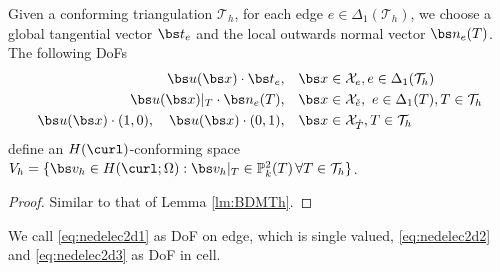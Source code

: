 

 \begin{lemma}
 Given a conforming triangulation $\mathcal T_h$, for each edge $e\in \Delta_1(\mathcal T_h)$, we choose a global tangential vector $\bs t_e$ and the local outwards normal vector $\bs n_e(T)$. The following {\rm DoFs}
   \begin{align}
     \bs u(\bs x) \cdot \bs t_{e}, \quad & 
     \bs x \in \mathcal X_{e}, e \in \Delta_1(\mathcal T_h) \label{eq:nedelec2d1}\\ 
     \bs u(\bs x)|_{T} \cdot \bs n_e(T), \quad & 
     \bs x \in \mathcal X_{\mathring{e}}, \ e \in \Delta_1(T), T 
     \in \mathcal T_h\label{eq:nedelec2d2}\\
     \bs u(\bs x) \cdot (1, 0), \quad 
     \bs u(\bs x) \cdot (0, 1), \quad & 
     \bs x \in \mathcal X_{\mathring{T}},  
     T \in \mathcal T_h\label{eq:nedelec2d3}
   \end{align}
   define an $H(\curl)$-conforming space 
   $V_h=\{\bs v_h\in H(\curl; \Omega): \bs v_h|_T\in\mathbb P_k^2(T) \, 
   \forall T\in\mathcal T_h\}$.
 \end{lemma}
 \begin{proof}
  Similar to that of Lemma \ref{lm:BDMTh}.
 \end{proof}
 We call \eqref{eq:nedelec2d1} as DoF on edge, which is single valued, \eqref{eq:nedelec2d2} and 
 \eqref{eq:nedelec2d3} as DoF in cell.



